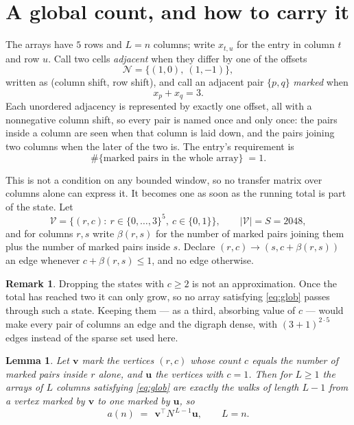 \documentclass[11pt,a4paper]{article}
\theoremstyle{plain}
\newtheorem{lemma}[theorem]{Lemma}
\theoremstyle{definition}
\newtheorem{remark}[theorem]{Remark}
\begin{document}
\section{A global count, and how to carry it}

The arrays have $5$ rows and $L=n$ columns; write $x_{t,u}$ for the entry in
column $t$ and row $u$. Call two cells \emph{adjacent} when they differ by one of the
offsets
\[
\mathcal N=\{(1,0),\ (1,-1)\},
\]
written as (column shift, row shift), and call an adjacent pair $\{p,q\}$
\emph{marked} when
\[
x_{p}+x_{q}=3 .
\]
Each unordered adjacency is represented by exactly one offset, all with a nonnegative column
shift, so every pair is named once and only once: the pairs inside a column are seen when
that column is laid down, and the pairs joining two columns when the later of the two is. The
entry's requirement is
\begin{equation}\label{eq:glob}
\#\{\text{marked pairs in the whole array}\}\;=1.
\end{equation}

This is not a condition on any bounded window, so no transfer matrix over columns alone can
express it. It becomes one as soon as the running total is part of the state. Let
\[
\mathcal V=\bigl\{(r,c):\ r\in\{0,\dots,3\}^{5},\ c\in\{0,1\}\bigr\},
\qquad |\mathcal V|=S=2048,
\]
and for columns $r,s$ write $\beta(r,s)$ for the number of marked pairs joining them plus the
number of marked pairs inside $s$. Declare $(r,c)\to(s,c+\beta(r,s))$ an edge whenever
$c+\beta(r,s)\le1$, and no edge otherwise.

\begin{remark}
Dropping the states with $c\ge2$ is not an approximation. Once the total has reached two it
can only grow, so no array satisfying \eqref{eq:glob} passes through such a state. Keeping
them --- as a third, absorbing value of $c$ --- would make every pair of columns an edge and
the digraph dense, with $(3+1)^{2\cdot5}$ edges instead of the sparse set used here.
\end{remark}

\begin{lemma}\label{lem:walk}
Let $\mathbf{v}$ mark the vertices $(r,c)$ whose count $c$ equals the number of marked pairs
inside $r$ alone, and $\mathbf{u}$ the vertices with $c=1$. Then for $L\ge1$ the arrays
of $L$ columns satisfying \eqref{eq:glob} are exactly the walks of length $L-1$ from a
vertex marked by $\mathbf{v}$ to one marked by $\mathbf{u}$, so
\[
a(n)\;=\;\,\mathbf{v}^{\!\top}N^{\,L-1}\mathbf{u},\qquad L=n .
\]
\end{lemma}
\end{document}
